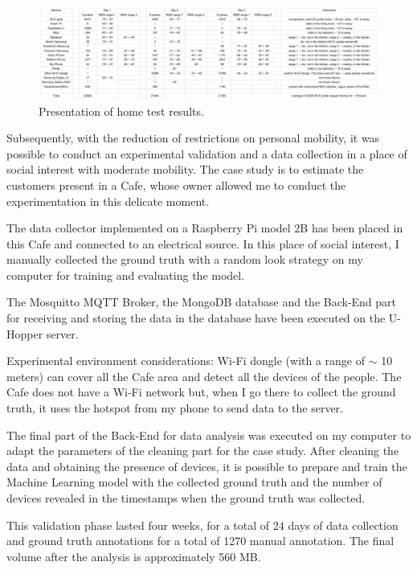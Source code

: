 \begin{figure}[h]
\centering 
\includegraphics[width=1\textwidth]{images/sniffertest} 
\caption{Presentation of home test results.}
\label{fig:sniffertest}
\end{figure}

Subsequently, with the reduction of restrictions on personal mobility, it was possible to conduct an experimental validation and a data collection in a place of social interest with moderate mobility. The case study is to estimate the customers present in a Cafe, whose owner allowed me to conduct the experimentation in this delicate moment.

The data collector implemented on a Raspberry Pi model 2B has been placed in this Cafe and connected to an electrical source. In this place of social interest, I manually collected the ground truth with a random look strategy on my computer for training and evaluating the model.

The Mosquitto MQTT Broker, the MongoDB database and the Back-End part for receiving and storing the data in the database have been executed on the U-Hopper server.

Experimental environment considerations: Wi-Fi dongle (with a range of $\sim$ 10 meters) can cover all the Cafe area and detect all the devices of the people. The Cafe does not have a Wi-Fi network but, when I go there to collect the ground truth, it uses the hotspot from my phone to send data to the server.

The final part of the Back-End for data analysis was executed on my computer to adapt the parameters of the cleaning part for the case study. After cleaning the data and obtaining the presence of devices, it is possible to prepare and train the Machine Learning model with the collected ground truth and the number of devices revealed in the timestamps when the ground truth was collected.


This validation phase lasted four weeks, for a total of 24 days of data collection and ground truth annotations for a total of 1270 manual annotation. The final volume after the analysis is approximately 560 MB.


